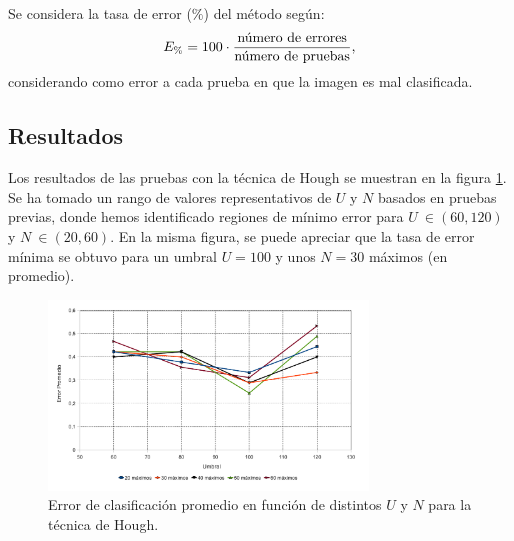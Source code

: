 \documentclass[conference,a4paper,10pt,oneside,final]{tfmpd}
\begin{document}
Se considera la tasa de error ($\%$) del método según:
\begin{equation}
E_\%=100\cdot\frac{\textrm{número de errores}}{\textrm{número de pruebas}},
\end{equation}
considerando como error a cada prueba en que la imagen es mal clasificada.
%
%
\subsection*{Resultados}
Los resultados de las pruebas con {la técnica} de Hough se muestran en la figura
\ref{graficaerror}. Se ha tomado un rango de valores representativos de $U$
y $N$ basados en pruebas previas, donde hemos identificado regiones de mínimo
error para $U~\in(60,120)$ y $N~\in(20,60)$.
En la misma figura, se puede apreciar que la tasa de error mínima se obtuvo
para un umbral $U = 100$ y unos $N = 30$ máximos (en promedio).

\begin{figure}
\begin{center}
\includegraphics[width=8.5cm]{../diagramas/estadistica_noche_iguales}
\end{center}
\caption{Error de clasificación promedio en función de distintos $U$ y $N$ para
{la técnica} de Hough.}
\label{graficaerror}
\end{figure}
\end{document}
